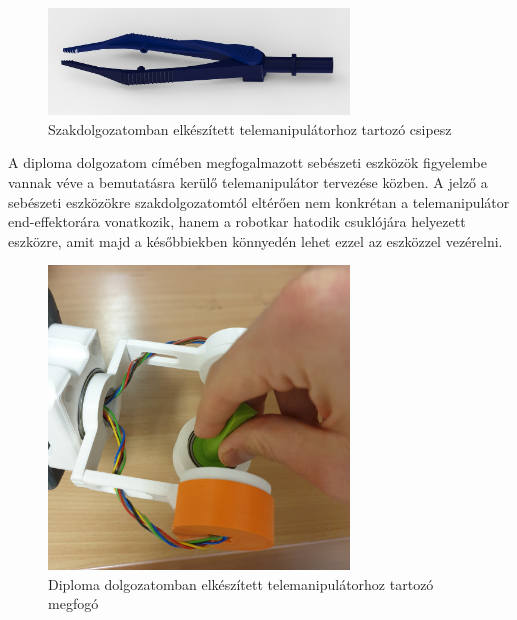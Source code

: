 \begin{figure}[!ht]
\centering
\includegraphics[width=80mm, keepaspectratio]{figures/Szakdoga/csipesz}
\caption{Szakdolgozatomban elkészített telemanipulátorhoz tartozó csipesz\cite{szakdoga}}
\label{fig:Szakdoga_csipeszes}
\end{figure}

A diploma dolgozatom címében megfogalmazott sebészeti eszközök figyelembe vannak véve a bemutatásra kerülő telemanipulátor tervezése közben. A jelző a sebészeti eszközökre szakdolgozatomtól eltérően nem konkrétan a telemanipulátor end-effektorára vonatkozik, hanem a robotkar hatodik csuklójára helyezett eszközre, amit majd a későbbiekben könnyedén lehet ezzel az eszközzel vezérelni.

\begin{figure}[!ht]
\centering
\includegraphics[width=80mm, keepaspectratio]{figures/Szumma/Megfogott_megfogo}
\caption{Diploma dolgozatomban elkészített telemanipulátorhoz tartozó megfogó}
\label{fig:Diploma_EE}
\end{figure}